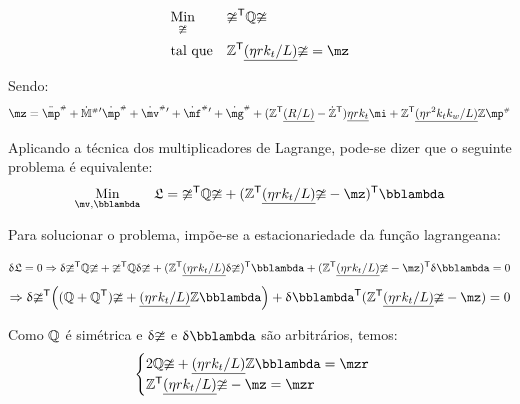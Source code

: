 \documentclass[a4paper,11pt,brazil,fleqn]{article}
\begin{document}
\begin{equation} \label{eq:Optimization_}
\begin{aligned}
& \underset{\mup}{\text{Min}}
& & \mup^\msT \mQ \mup \\
& \text{tal que}
& & \mZ^\msT  \underline{(\eta r k_t / L)} \mup = \mz
\end{aligned}
\end{equation}

Sendo:
\begin{equation} \label{eq:muplinha}
\mz = \ddot{\mp}\ssh + {{\dot{\mM}}\ssh}{'} \dot{\mp}\ssh + {\dot{\mv}\ssh}{'} + {\dot{\mf}\ssh}{'} + {\dot{\mg}\ssh} + ( \mZ^\msT  \underline{(R/L)} - \dot{\mZ}^\msT ) \underline{\eta r k_t} \mi + \mZ^\msT  \underline{(\eta r^2 k_t k_w / L)}  \mZ \mp\ssh
\end{equation}

Aplicando a t\'ecnica dos multiplicadores de Lagrange, pode-se dizer que o seguinte problema \'e equivalente:
\begin{equation}
\begin{aligned}
& \underset{\mv, \mlambda}{\text{Min}}
& & \mathfrak{L} = \mup^\msT \mQ \mup + (\mZ^\msT  \underline{(\eta r k_t / L)} \mup - \mz)^\msT \mlambda \\
\end{aligned}
\end{equation}


Para solucionar o problema, imp\~oe-se a estacionariedade da fun\c{c}\~ao lagrangeana:

$$ \dl \mathfrak{L} = 0 \Rightarrow \dl \mup^\msT \mQ \mup + \mup^\msT \mQ \dl \mup + (\mZ^\msT  \underline{(\eta r k_t / L)} \dl \mup)^\msT \mlambda + (\mZ^\msT  \underline{(\eta r k_t / L)} \mup - \mz)^\msT \dl \mlambda = 0 $$
$$ \Rightarrow \dl \mup^\msT \Big( (\mQ + \mQ^\msT)\mup + \underline{(\eta r k_t / L)} \mZ \mlambda \Big) + \dl \mlambda^\msT (\mZ^\msT  \underline{(\eta r k_t / L)} \mup - \mz) = 0 $$

Como $\mathbb{Q}$ \'e sim\'etrica e ${\updelta} \mathbb{\upsilon}$ e $\dl \mlambda$ s\~ao arbitr\'arios, temos:
\begin{equation} \label{eq:OptimizationSol_}
\begin{cases}
2 \mQ \mup + \underline{(\eta r k_t / L)} \mZ \mlambda = \mzr \\
\mZ^\msT  \underline{(\eta r k_t / L)} \mup - \mz = \mzr
\end{cases}
\end{equation}
\end{document}
